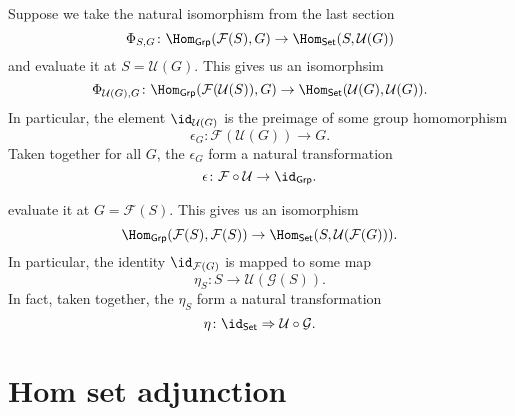 \documentclass[notes.tex]{subfiles}
\begin{document}
Suppose we take the natural isomorphism from the last section
\begin{equation*}
  \Phi_{S, G}\colon \Hom_{\mathsf{Grp}}(\mathcal{F}(S), G) \to \Hom_{\mathsf{Set}}(S, \mathcal{U}(G))
\end{equation*}
and evaluate it at $S = \mathcal{U}(G)$. This gives us an isomorphsim
\begin{equation*}
  \Phi_{\mathcal{U}(G), G}\colon \Hom_{\mathsf{Grp}}(\mathcal{F}(\mathcal{U}(S)), G) \to \Hom_{\mathsf{Set}}(\mathcal{U}(G), \mathcal{U}(G)).
\end{equation*}
In particular, the element $\id_{\mathcal{U}(G)}$ is the preimage of some group homomorphism
\begin{equation*}
  \epsilon_{G}\colon \mathcal{F}(\mathcal{U}(G)) \to G.
\end{equation*}
Taken together for all $G$, the $\epsilon_{G}$ form a natural transformation
\begin{equation*}
  \epsilon\colon \mathcal{F} \circ \mathcal{U} \to \id_{\mathsf{Grp}}.
\end{equation*}

evaluate it at $G = \mathcal{F}(S)$. This gives us an isomorphism
\begin{equation*}
  \Hom_{\mathsf{Grp}}(\mathcal{F}(S), \mathcal{F}(S)) \to \Hom_{\mathsf{Set}}(S, \mathcal{U}(\mathcal{F}(G))).
\end{equation*}
In particular, the identity $\id_{\mathcal{F}(G)}$ is mapped to some map
\begin{equation*}
  \eta_{S}\colon S \to \mathcal{U}(\mathcal{G}(S)).
\end{equation*}
In fact, taken together, the $\eta_{S}$ form a natural transformation
\begin{equation*}
  \eta\colon \id_{\mathsf{Set}} \Rightarrow \mathcal{U} \circ \mathcal{G}.
\end{equation*}


\section{Hom set adjunction}
\label{sec:hom_set_adjunction}
\end{document}
